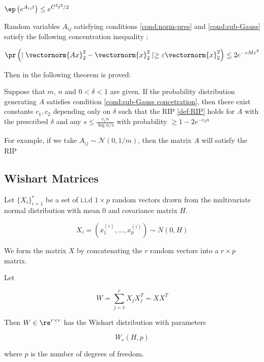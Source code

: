 \begin{condition}
\(\ep\left( e^{A_{ij}t} \right) \leq e^{C^2 t^2 /2}\)
\label{cond:sub-Gauss}
\end{condition}

Random variables \(A_{ij}\) satisfying conditions \eqref{cond:norm-pres} and \eqref{cond:sub-Gauss} satisfy the following concentration inequality \cite{baraniuk2008simple}:

\begin{condition}
\begin{equation}
\pr\left( \mid \vectornorm{Ax}_2^2 - \vectornorm{x}_2^2 \mid \geq \varepsilon  \vectornorm{x}_2^2 \right) \leq 2e^{-cM\varepsilon^2}
\label{cond:sub-Gauss concetration}
\end{equation} 
\end{condition}

Then in \cite{baraniuk2008simple} the following theorem is proved:

\begin{theorem}
Suppose that \(m\), \(n\) and \(0 < \delta < 1\) are given. If the probability distribution generating \(A\) satisfies condition \eqref{cond:sub-Gauss concetration}, then there exist constants \(c_1, c_2\) depending only on \(\delta\) such that the RIP \eqref{def:RIP} holds for \(A\) with the prescribed \(\delta\) and any  \(s \leq \frac{c_1 n}{\log{n/s}}\) with probability \(\geq 1-2e^{-c_2n}\) 
\end{theorem}

For example, if we take \(A_{ij} \sim \mathcal{N}\left(0, 1/m\right)\), then the matrix \(A\) will satisfy the RIP 

\subsection{Wishart Matrices}

Let \(\{X_i\}_{i=1}^r\) be a set of i.i.d \(1 \times p\) random vectors drawn from the multivariate normal distribution with mean 0 and covariance matrix \(H\).

\begin{equation}
X_i = \left(x_1^{(i)}, \ldots , x_p^{(i)}\right) \sim N\left(0, H\right)
\end{equation}

We form the matrix \(X\) by concatenating the \(r\) random vectors into a \(r \times p\) matrix.

\begin{definition}
Let 

\begin{equation}
W = \sum_{j=1}^r X_j X_j^T =  X X^T
\end{equation}

Then \(W \in \re^{r \times r}\) has the Wishart distribution with parameters 

\begin{equation}
W_r\left(H, p\right)
\end{equation}

where \(p\) is the number of degrees of freedom.
\end{definition}

